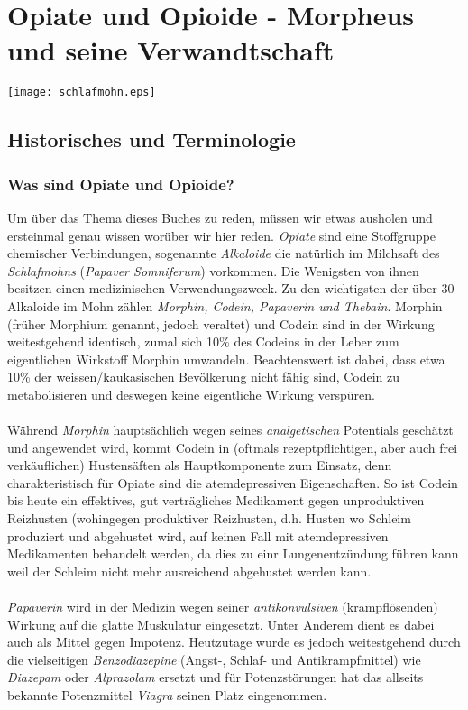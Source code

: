 \documentclass[b5paper,10pt,dvips,fleqn,titlepage,twoside]{book}
\begin{document}
\part{Opiate und Opioide - Morpheus und seine Verwandtschaft}
\texttt{[image: schlafmohn.eps]}
\chapter{Historisches und Terminologie}

\section{Was sind Opiate und Opioide?}
Um über das Thema dieses Buches zu reden, müssen wir etwas ausholen und ersteinmal genau wissen worüber wir hier reden. \emph{Opiate} sind eine Stoffgruppe chemischer Verbindungen, sogenannte \emph{Alkaloide} die natürlich im Milchsaft des \emph{Schlafmohns} (\textit{Papaver Somniferum}) vorkommen. Die Wenigsten von ihnen besitzen einen medizinischen Verwendungszweck. Zu den wichtigsten der über 30 Alkaloide im Mohn zählen \emph{Morphin, Codein, Papaverin und Thebain}. Morphin (früher Morphium genannt, jedoch veraltet) und Codein sind in der Wirkung weitestgehend identisch, zumal sich 10\% des Codeins in der Leber zum eigentlichen Wirkstoff Morphin umwandeln. Beachtenswert ist dabei, dass etwa 10\% der weissen/kaukasischen Bevölkerung nicht fähig sind, Codein zu metabolisieren und deswegen keine eigentliche Wirkung verspüren.\\\\
Während \emph{Morphin} hauptsächlich wegen seines \emph{analgetischen} Potentials geschätzt und angewendet wird, kommt Codein in (oftmals rezeptpflichtigen, aber auch frei verkäuflichen) Hustensäften als Hauptkomponente zum Einsatz, denn charakteristisch für Opiate sind die atemdepressiven Eigenschaften. So ist Codein bis heute ein effektives, gut verträgliches Medikament gegen unproduktiven Reizhusten (wohingegen produktiver Reizhusten, d.h. Husten wo Schleim produziert und abgehustet wird, auf keinen Fall mit atemdepressiven Medikamenten behandelt werden, da dies zu einr Lungenentzündung führen kann weil der Schleim nicht mehr ausreichend abgehustet werden kann.\\
\\
\emph{Papaverin} wird in der Medizin wegen seiner \emph{antikonvulsiven} (krampflösenden) Wirkung auf die glatte Muskulatur eingesetzt. Unter Anderem dient es dabei auch als Mittel gegen Impotenz. Heutzutage wurde es jedoch weitestgehend durch die vielseitigen \emph{Benzodiazepine} (Angst-, Schlaf- und Antikrampfmittel) wie \emph{Diazepam} oder \emph{Alprazolam} ersetzt und für Potenzstörungen hat das allseits bekannte Potenzmittel \emph{Viagra} seinen Platz eingenommen.\\
\end{document}
